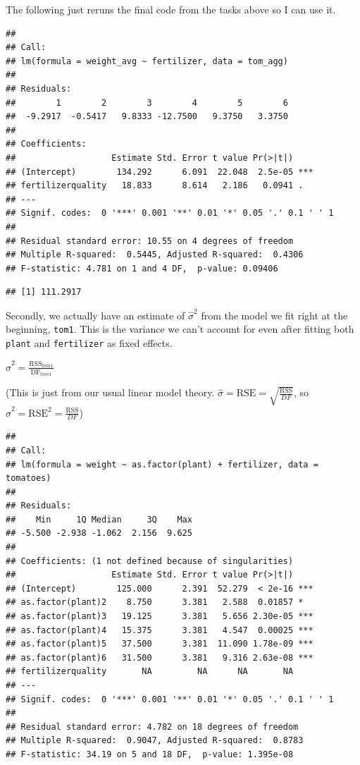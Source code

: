 \documentclass[
  openany]{book}
\begin{document}
The following just reruns the final code from the tasks above so I can use it.

\begin{verbatim}
## 
## Call:
## lm(formula = weight_avg ~ fertilizer, data = tom_agg)
## 
## Residuals:
##        1        2        3        4        5        6 
##  -9.2917  -0.5417   9.8333 -12.7500   9.3750   3.3750 
## 
## Coefficients:
##                   Estimate Std. Error t value Pr(>|t|)    
## (Intercept)        134.292      6.091  22.048  2.5e-05 ***
## fertilizerquality   18.833      8.614   2.186   0.0941 .  
## ---
## Signif. codes:  0 '***' 0.001 '**' 0.01 '*' 0.05 '.' 0.1 ' ' 1
## 
## Residual standard error: 10.55 on 4 degrees of freedom
## Multiple R-squared:  0.5445, Adjusted R-squared:  0.4306 
## F-statistic: 4.781 on 1 and 4 DF,  p-value: 0.09406
\end{verbatim}

\begin{verbatim}
## [1] 111.2917
\end{verbatim}

Secondly, we actually have an estimate of \(\hat{\sigma}^2\) from the model we fit right at the beginning, \texttt{tom1}. This is the variance we can't account for even after fitting both \texttt{plant} and \texttt{fertilizer} as fixed effects.

\(\hat{\sigma}^2 = \frac{\text{RSS}_{tom1}}{\text{DF}_{tom1}}\)

(This is just from our usual linear model theory. \(\hat{\sigma} = \text{RSE} = \sqrt{\frac{\text{RSS}}{DF}}\), so \(\hat{\sigma}^2 = \text{RSE}^2 = \frac{\text{RSS}}{DF}\))

\begin{verbatim}
## 
## Call:
## lm(formula = weight ~ as.factor(plant) + fertilizer, data = tomatoes)
## 
## Residuals:
##    Min     1Q Median     3Q    Max 
## -5.500 -2.938 -1.062  2.156  9.625 
## 
## Coefficients: (1 not defined because of singularities)
##                   Estimate Std. Error t value Pr(>|t|)    
## (Intercept)        125.000      2.391  52.279  < 2e-16 ***
## as.factor(plant)2    8.750      3.381   2.588  0.01857 *  
## as.factor(plant)3   19.125      3.381   5.656 2.30e-05 ***
## as.factor(plant)4   15.375      3.381   4.547  0.00025 ***
## as.factor(plant)5   37.500      3.381  11.090 1.78e-09 ***
## as.factor(plant)6   31.500      3.381   9.316 2.63e-08 ***
## fertilizerquality       NA         NA      NA       NA    
## ---
## Signif. codes:  0 '***' 0.001 '**' 0.01 '*' 0.05 '.' 0.1 ' ' 1
## 
## Residual standard error: 4.782 on 18 degrees of freedom
## Multiple R-squared:  0.9047, Adjusted R-squared:  0.8783 
## F-statistic: 34.19 on 5 and 18 DF,  p-value: 1.395e-08
\end{verbatim}
\end{document}
